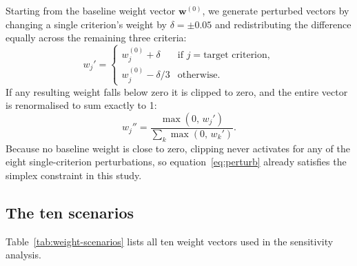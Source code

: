 \documentclass[11pt]{article}
\begin{document}
Starting from the baseline weight vector $\mathbf{w}^{(0)}$, we generate
perturbed vectors by changing a single criterion's weight by $\delta = \pm 0.05$
and redistributing the difference equally across the remaining three criteria:
\begin{equation}
  w_j' =
  \begin{cases}
    w_j^{(0)} + \delta & \text{if } j = \text{target criterion}, \\
    w_j^{(0)} - \delta/3 & \text{otherwise}.
  \end{cases}
  \label{eq:perturb}
\end{equation}
If any resulting weight falls below zero it is clipped to zero, and the
entire vector is renormalised to sum exactly to 1:
\begin{equation}
  w_j'' = \frac{\max(0,\, w_j')}{\sum_{k} \max(0,\, w_k')}.
  \label{eq:renorm}
\end{equation}
Because no baseline weight is close to zero, clipping never activates for
any of the eight single-criterion perturbations, so equation~\eqref{eq:perturb}
already satisfies the simplex constraint in this study.

\subsection{The ten scenarios}

Table~\ref{tab:weight-scenarios} lists all ten weight vectors used in the
sensitivity analysis.
\end{document}

